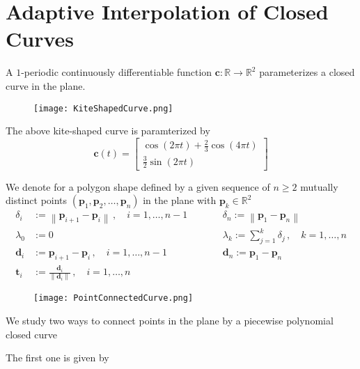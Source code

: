 \documentclass{article}
\begin{document}
\section*{Adaptive Interpolation of Closed Curves}
A $1$-periodic continuously differentiable function  $\mathbf{c}: \mathbb{R} \to \mathbb{R}^{2}$ parameterizes a closed curve in the plane.

\begin{figure}[!hbt]
    \centering
\texttt{[image: KiteShapedCurve.png]}
\end{figure}

The above kite-shaped curve is paramterized by 
\begin{equation*}
    \mathbf{c}\left(t\right) = \begin{bmatrix}
    \cos\left(2\pi t\right) + \frac{2}{3}\cos\left(4\pi t\right) \\
    \frac{3}{2} \sin\left(2\pi t\right)
    \end{bmatrix}
\end{equation*}

We denote for a polygon shape defined by a given sequence of $n \geq 2$ mutually distinct points $\left(\mathbf{p}_{1}, \mathbf{p}_{2}, \dots, \mathbf{p}_{n}\right)$ in the plane with $\mathbf{p}_{k} \in \mathbb{R}^{2}$
\begin{align*}
    \delta_{i} &:= \left\lVert \mathbf{p}_{i+1} - \mathbf{p}_{i} \right\rVert \, ,\quad i = 1, \dots, n-1 \qquad
    &&\delta_{n} := \left\lVert \mathbf{p}_{1} - \mathbf{p}_{n} \right\rVert \\
    \lambda_{0} &:= 0 \qquad
    &&\lambda_{k} := \sum_{j=1}^{k} \delta_{j}\,,\quad k = 1,\dots, n \\
    \mathbf{d}_{i} &:= \mathbf{p}_{i+1} - \mathbf{p}_{i}\,,\quad i=1, \dots, n-1 \qquad
    &&\mathbf{d}_{n} := \mathbf{p}_{1} - \mathbf{p}_{n} \\
    \mathbf{t}_{i} &:= \frac{\mathbf{d}_{i}}{\left\lVert \mathbf{d}_{i}\right\rVert}\,,\quad i = 1, \dots, n
\end{align*}

\begin{figure}[!hbt]
    \centering
\texttt{[image: PointConnectedCurve.png]}
\end{figure}

We study two ways to connect points in the plane by a piecewise polynomial closed curve

\pagebreak

\noindent The first one is given by
\end{document}
